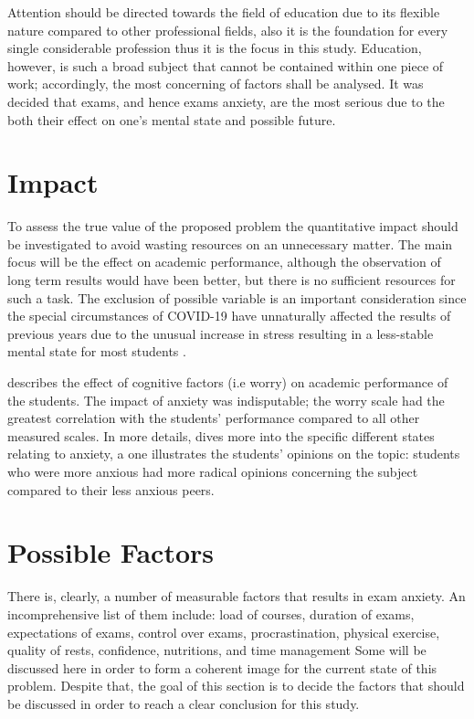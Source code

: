 \documentclass[12pt]{report}
\begin{document}
Attention should be directed towards the field of education due to its flexible
nature compared to other professional fields, also it is the foundation for
every single considerable profession thus it is the focus in this study.
Education, however, is such a broad subject that cannot be contained within one
piece of work; accordingly, the most concerning of factors shall be analysed. It
was decided that exams, and hence exams anxiety, are the most serious due to the
both their effect on one's mental state and possible future.

\section{Impact}

To assess the true value of the proposed problem the quantitative impact should
be investigated to avoid wasting resources on an unnecessary matter. The main
focus will be the effect on academic performance, although the observation of
long term results would have been better, but there is no sufficient resources
for such a task. The exclusion of possible variable is an important
consideration since the special circumstances of COVID-19 have unnaturally
affected the results of previous years due to the unusual increase in stress
resulting in a less-stable mental state for most students
\parencite{covid19-impact}.

\cite{rana_2010_the} describes the effect of cognitive factors (i.e worry) on
academic performance of the students. The impact of anxiety was indisputable;
the worry scale had the greatest correlation with the students' performance
compared to all other measured scales. In more details, \cite{trifoni2011does}
dives more into the specific different states relating to anxiety, a one
illustrates the students' opinions on the topic: students who were more anxious
had more radical opinions concerning the subject compared to their less anxious
peers.

\section{Possible Factors}

There is, clearly, a number of measurable factors that results in exam anxiety.
An incomprehensive list of them include: load of courses, duration of exams,
expectations of exams, control over exams, procrastination, physical exercise,
quality of rests, confidence, nutritions, and time management Some will be
discussed here in order to form a coherent image for the current state of this
problem. Despite that, the goal of this section is to decide the factors that
should be discussed in order to reach a clear conclusion for this study.
\end{document}

